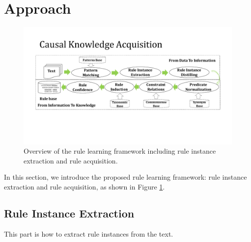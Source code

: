 \section{Approach}
\label{sec:approach}
\begin{figure}[htbp]
	\centering
	\includegraphics[width=\textwidth]{figures/approach}
	\caption{Overview of the rule learning framework including rule instance extraction and rule acquisition.}
	\label{fig:approach}
\end{figure}
In this section, we introduce the proposed rule learning framework: rule instance extraction and rule acquisition, as shown in Figure \ref{fig:approach}.
\subsection{Rule Instance Extraction}
This part is how to extract rule instances from the text.

